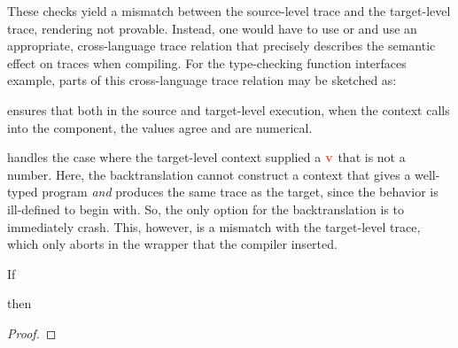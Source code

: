 \documentclass[a4paper,12pt]{article}
\begin{document}
These checks yield a mismatch between the source-level trace and the target-level trace, rendering  not provable.
Instead, one would have to use  or  and use an appropriate, cross-language trace relation that precisely describes the semantic effect on traces when compiling.
For the type-checking function interfaces example, parts of this cross-language trace relation may be sketched as:

\begin{center}
\end{center}
 ensures that both in the source and target-level execution, when the context calls into the component, the values agree and are numerical.

 handles the case where the target-level context supplied a $\trg{v}$ that is not a number.
Here, the backtranslation cannot construct a context that gives a well-typed program {\em and} produces the same trace as the target, since the behavior is ill-defined to begin with.
So, the only option for the backtranslation is to immediately crash.
This, however, is a mismatch with the target-level trace, which only aborts in the wrapper that the compiler inserted.

\begin{lemma}{}
  If 
  \begin{assumptions}
  \end{assumptions}
  then
  \begin{goals}
  \end{goals}
\end{lemma}
\begin{proof}
  \incompleteProof
\end{proof}
\end{document}
